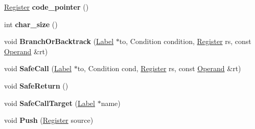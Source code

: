 \begin{DoxyCompactItemize}
\item 
\hyperlink{structv8_1_1internal_1_1_register}{Register} {\bfseries code\+\_\+pointer} ()\hypertarget{classv8_1_1internal_1_1_reg_exp_macro_assembler_m_i_p_s_abc9969c6821755a52c50dad37f3ee5d2}{}\label{classv8_1_1internal_1_1_reg_exp_macro_assembler_m_i_p_s_abc9969c6821755a52c50dad37f3ee5d2}

\item 
int {\bfseries char\+\_\+size} ()\hypertarget{classv8_1_1internal_1_1_reg_exp_macro_assembler_m_i_p_s_a90e3aab1b3877a8663409ebb253f1050}{}\label{classv8_1_1internal_1_1_reg_exp_macro_assembler_m_i_p_s_a90e3aab1b3877a8663409ebb253f1050}

\item 
void {\bfseries Branch\+Or\+Backtrack} (\hyperlink{classv8_1_1internal_1_1_label}{Label} $\ast$to, Condition condition, \hyperlink{structv8_1_1internal_1_1_register}{Register} rs, const \hyperlink{classv8_1_1internal_1_1_operand}{Operand} \&rt)\hypertarget{classv8_1_1internal_1_1_reg_exp_macro_assembler_m_i_p_s_a0a61cccf21e0a2a6b52e418b27eb1153}{}\label{classv8_1_1internal_1_1_reg_exp_macro_assembler_m_i_p_s_a0a61cccf21e0a2a6b52e418b27eb1153}

\item 
void {\bfseries Safe\+Call} (\hyperlink{classv8_1_1internal_1_1_label}{Label} $\ast$to, Condition cond, \hyperlink{structv8_1_1internal_1_1_register}{Register} rs, const \hyperlink{classv8_1_1internal_1_1_operand}{Operand} \&rt)\hypertarget{classv8_1_1internal_1_1_reg_exp_macro_assembler_m_i_p_s_a33f184465610b071f3cb1169eab36ce6}{}\label{classv8_1_1internal_1_1_reg_exp_macro_assembler_m_i_p_s_a33f184465610b071f3cb1169eab36ce6}

\item 
void {\bfseries Safe\+Return} ()\hypertarget{classv8_1_1internal_1_1_reg_exp_macro_assembler_m_i_p_s_a1e59cb61230601895d4465a0227168be}{}\label{classv8_1_1internal_1_1_reg_exp_macro_assembler_m_i_p_s_a1e59cb61230601895d4465a0227168be}

\item 
void {\bfseries Safe\+Call\+Target} (\hyperlink{classv8_1_1internal_1_1_label}{Label} $\ast$name)\hypertarget{classv8_1_1internal_1_1_reg_exp_macro_assembler_m_i_p_s_aaa0695e965306ca0eec9aff29fbbac13}{}\label{classv8_1_1internal_1_1_reg_exp_macro_assembler_m_i_p_s_aaa0695e965306ca0eec9aff29fbbac13}

\item 
void {\bfseries Push} (\hyperlink{structv8_1_1internal_1_1_register}{Register} source)\hypertarget{classv8_1_1internal_1_1_reg_exp_macro_assembler_m_i_p_s_ae8b3687ba22d8555ac4c8650ba92490e}{}\label{classv8_1_1internal_1_1_reg_exp_macro_assembler_m_i_p_s_ae8b3687ba22d8555ac4c8650ba92490e}


\end{DoxyCompactItemize}
